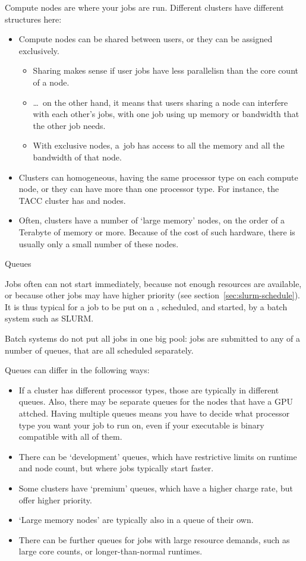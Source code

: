 Compute nodes are where your jobs are run.
Different clusters have
different structures here:
\begin{itemize}
\item Compute nodes can be shared between users, or they can be assigned exclusively.
  \begin{itemize}
  \item
    Sharing makes sense if user jobs have less parallelisn than the core count of a node.
  \item \ldots~on the other hand, it means that users sharing a node
    can interfere with each other's jobs, with one job using up memory or bandwidth
    that the other job needs.
  \item With exclusive nodes, a~job has access to all the memory and
    all the bandwidth of that node.
  \end{itemize}
\item Clusters can homogeneous, having the same processor type on each
  compute node, or they can have more than one processor type. For
  instance, the TACC  cluster has
   and  nodes.
\item Often, clusters have a number of `large memory'
  nodes, on the order of a Terabyte of memory or more.
  Because of the cost of such hardware, there is usually only
  a small number of these nodes.
\end{itemize}

 {Queues}

Jobs often can not start immediately, because not enough
resources are available, or because other jobs may have higher priority
(see section~\ref{sec:slurm-schedule}).
It is thus typical for a job to be
put on a , scheduled, and started,
by a batch system such as \ac{SLURM}.

Batch systems do not put all jobs in one big pool:
jobs are submitted to any of a number of queues,
that are all scheduled separately.

Queues can differ in the following ways:
\begin{itemize}
\item If a cluster has different processor types, those are typically
  in different queues. Also, there may be separate queues for the nodes that
  have a \ac{GPU} attched. Having multiple queues means
  you have to decide what processor type you
  want your job to run on, even if your executable is binary compatible with
  all of them.
\item There can be `development' queues, which have restrictive limits on runtime and
  node count, but where jobs typically start faster.
\item Some clusters have `premium' queues, which have a higher charge rate, but
  offer higher priority.
\item `Large memory nodes' are typically also in a queue of their own.
\item There can be further queues for jobs with large resource demands, such
  as large core counts, or longer-than-normal runtimes.
\end{itemize}

